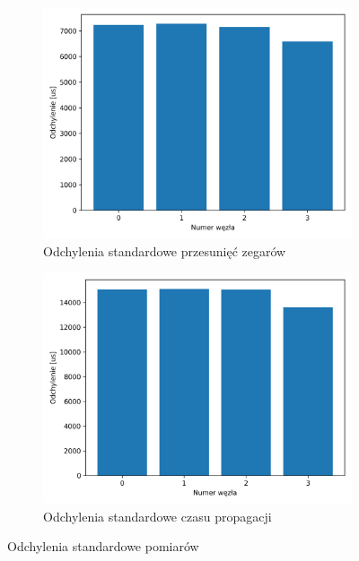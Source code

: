 \begin{figure}[H]
    \centering
    \begin{subfigure}{0.5\textwidth}
        \centering
        \includegraphics[width=\textwidth]{pics/ntp_sync/stddev_offsets.png}
        \caption{Odchylenia standardowe przesunięć zegarów}
        \label{pic:stddev_ntp_offsets}
    \end{subfigure}%
    \begin{subfigure}{0.5\textwidth}
        \centering
        \includegraphics[width=\textwidth]{pics/ntp_sync/stddev_prop.png}
        \caption{Odchylenia standardowe czasu propagacji}
        \label{pic:stddev_ntp_prop}
    \end{subfigure}
    \caption{Odchylenia standardowe pomiarów}
    \label{fig:stddev_ntp}
\end{figure}

